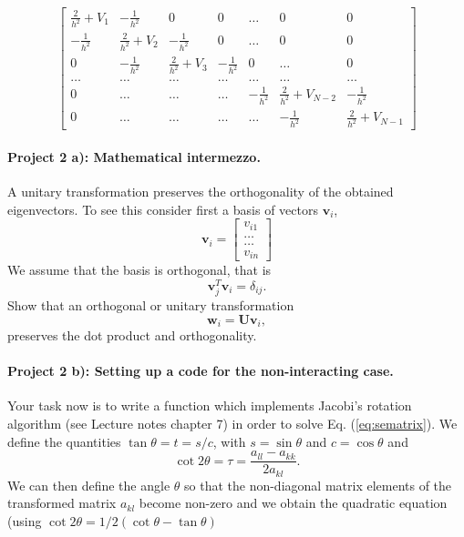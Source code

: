 \documentclass[%
oneside,                 %
final,                   %
10pt]{article}
\begin{document}
\begin{equation}
    \begin{bmatrix} \frac{2}{h^2}+V_1 & -\frac{1}{h^2} & 0   & 0    & \dots  &0     & 0 \\
                                -\frac{1}{h^2} & \frac{2}{h^2}+V_2 & -\frac{1}{h^2} & 0    & \dots  &0     &0 \\
                                0   & -\frac{1}{h^2} & \frac{2}{h^2}+V_3 & -\frac{1}{h^2}  &0       &\dots & 0\\
                                \dots  & \dots & \dots & \dots  &\dots      &\dots & \dots\\
                                0   & \dots & \dots & \dots  &-\frac{1}{h^2}  &\frac{2}{h^2}+V_{N-2} & -\frac{1}{h^2}\\
                                0   & \dots & \dots & \dots  &\dots       &-\frac{1}{h^2} & \frac{2}{h^2}+V_{N-1}
             \end{bmatrix}
\label{eq:matrixse} 
\end{equation}

\paragraph{Project 2 a): Mathematical intermezzo.}
A unitary transformation preserves  the orthogonality of the obtained eigenvectors. To see this consider first a basis of vectors $\mathbf{v}_i$,
\[
\mathbf{v}_i = \begin{bmatrix} v_{i1} \\ \dots \\ \dots \\v_{in} \end{bmatrix}
\]
We assume that the basis is orthogonal, that is 
\[
\mathbf{v}_j^T\mathbf{v}_i = \delta_{ij}.
\]
Show that an orthogonal or unitary transformation
\[
\mathbf{w}_i=\mathbf{U}\mathbf{v}_i,
\]
preserves the dot product and orthogonality. 

\paragraph{Project 2 b): Setting up a code for the non-interacting case.}
Your task now is to write a function which implements Jacobi's rotation algorithm (see Lecture notes chapter 7)  in order to solve Eq. (\ref{eq:sematrix}).  We define the quantities $\tan\theta = t= s/c$, with $s=\sin\theta$ and $c=\cos\theta$ and
\begin{equation*}\cot 2\theta=\tau = \frac{a_{ll}-a_{kk}}{2a_{kl}}.
\end{equation*}
We can then define the angle $\theta$ so that the non-diagonal matrix elements of the transformed matrix 
$a_{kl}$ become non-zero and
we obtain the quadratic equation (using $\cot 2\theta=1/2(\cot \theta-\tan\theta)$
\end{document}
